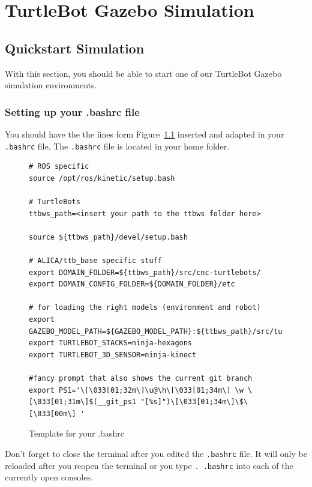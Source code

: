 \chapter{TurtleBot Gazebo Simulation}
\label{chap:TurtleBotGazeboSimulation}

\section{Quickstart Simulation}
\label{sec:QuickstartSimulation}

With this section, you should be able to start one of our TurtleBot Gazebo simulation environments. 

\subsection{Setting up your .bashrc file}
\label{ssec:bashrc}

You should have the the lines form Figure~\ref{fig:template_bashrc} inserted and adapted in your \verb$.bashrc$ file. The \verb$.bashrc$ file is located in your home folder. 
\begin{landscape}
  \begin{figure}[htbp]
    \begin{verbatim}
# ROS specific 
source /opt/ros/kinetic/setup.bash

# TurtleBots
ttbws_path=<insert your path to the ttbws folder here>

source ${ttbws_path}/devel/setup.bash

# ALICA/ttb_base specific stuff
export DOMAIN_FOLDER=${ttbws_path}/src/cnc-turtlebots/
export DOMAIN_CONFIG_FOLDER=${DOMAIN_FOLDER}/etc

# for loading the right models (environment and robot)
export GAZEBO_MODEL_PATH=${GAZEBO_MODEL_PATH}:${ttbws_path}/src/turtlebot/turtlebot_bringup/models
export TURTLEBOT_STACKS=ninja-hexagons
export TURTLEBOT_3D_SENSOR=ninja-kinect

#fancy prompt that also shows the current git branch
export PS1='\[\033[01;32m\]\u@\h\[\033[01;34m\] \w \[\033[01;31m\]$(__git_ps1 "[%s]")\[\033[01;34m\]\$\[\033[00m\] '
    \end{verbatim}
    \caption{Template for your .bashrc}
    \label{fig:template_bashrc}
  \end{figure}
\end{landscape}

Don't forget to close the terminal after you edited the \verb$.bashrc$ file. It will only be reloaded after you reopen the terminal or you type \verb$. .bashrc$ into each of the currently open consoles.

